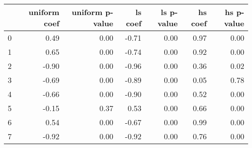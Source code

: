 \begin{tabular}{lrrrrrr}
\toprule
 & uniform coef & uniform p-value & ls coef & ls p-value & hs coef & hs p-value \\
\midrule
0 & 0.49 & 0.00 & -0.71 & 0.00 & 0.97 & 0.00 \\
1 & 0.65 & 0.00 & -0.74 & 0.00 & 0.92 & 0.00 \\
2 & -0.90 & 0.00 & -0.96 & 0.00 & 0.36 & 0.02 \\
3 & -0.69 & 0.00 & -0.89 & 0.00 & 0.05 & 0.78 \\
4 & -0.66 & 0.00 & -0.90 & 0.00 & 0.52 & 0.00 \\
5 & -0.15 & 0.37 & 0.53 & 0.00 & 0.66 & 0.00 \\
6 & 0.54 & 0.00 & -0.67 & 0.00 & 0.99 & 0.00 \\
7 & -0.92 & 0.00 & -0.92 & 0.00 & 0.76 & 0.00 \\
\bottomrule
\end{tabular}
